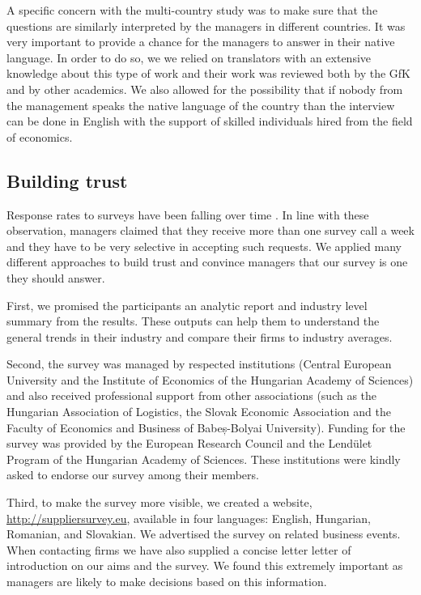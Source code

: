 \documentclass[final, dvipsnames, authoryear,12pt]{elsarticle}
\begin{document}
A specific concern with the multi-country study was to make sure that the questions are similarly interpreted by the managers in different countries. It was very important to provide a chance for the managers to answer in their native language. In order to do so, we we relied on translators with an extensive knowledge about this type of work and their work was reviewed both by the GfK and by other academics. We also allowed for the possibility that if nobody from the management speaks the native language of the country than the interview can be done in English with the support of skilled individuals hired from the field of economics.

\subsection{Building trust}
\label{sec:trust}

Response rates to surveys have been falling over time \citep{Bloom2014-hc}. In line with these observation, managers claimed that they receive more than one survey call a week and they have to be very selective in accepting such requests. We applied many different approaches to build trust and convince managers that our survey is one they should answer.

First, we promised the participants an analytic report and industry level summary from the results. These outputs can help them to understand the general trends in their industry and compare their firms to industry averages.

Second, the survey was managed by respected institutions (Central European University and the Institute of Economics of the Hungarian Academy of Sciences) and also received professional support from other associations (such as the Hungarian Association of Logistics, the Slovak Economic Association and the Faculty of Economics and Business of Babeș-Bolyai University). Funding for the survey was provided by the European Research Council and the Lendület Program of the Hungarian Academy of Sciences. These institutions were kindly asked to endorse our survey among their members.

Third, to make the survey more visible, we created a website, \url{http://suppliersurvey.eu}, available in four languages: English, Hungarian, Romanian, and Slovakian. We advertised the survey on related business events.
When contacting firms we have also supplied a concise letter letter of introduction on our aims and the survey. We found this extremely important as managers are likely to make decisions based on this information.
\end{document}
